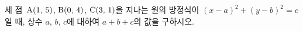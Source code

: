 세 점~$\mathrm{A}(1,\mkern3mu 5)$, $\mathrm{B}(0,\mkern3mu 4)$, $\mathrm{C}(3,\mkern3mu 1)$을 지나는 원의 방정식이 $(x-a)^2+(y-b)^2=c$일 때, 상수 $a$, $b$, $c$에 대하여 $a+b+c$의 값을 구하시오.
